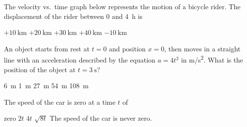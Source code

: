 \documentclass{../../../oss-apphys-exam}
\begin{document}
\begin{multicols*}{2}
\begin{questions}
    \question The velocity vs.\ time graph below represents the motion of a
    bicycle rider. The displacement of the rider between $0$ and \SI{4}{\hour}
    is
    \begin{center}
    \end{center}
    \begin{choices}
      \choice $+\SI{10}{\kilo\metre}$
      \choice $+\SI{20}{\kilo\metre}$
      \choice $+\SI{30}{\kilo\metre}$
      \choice $+\SI{40}{\kilo\metre}$
      \choice $-\SI{10}{\kilo\metre}$
    \end{choices}

    \question An object starts from rest at $t=0$ and position $x=0$, then moves
    in a straight line with an acceleration described by the equation $a=4t^2$
    in \si{m/s^2}. What is the position of the object at $t=\SI{3}{\second}$?
    \begin{choices}
      \choice\SI{6}{\metre}
      \choice\SI{1}{\metre}
      \choice\SI{27}{\metre}
      \choice\SI{54}{\metre}
      \choice\SI{108}{\metre}
    \end{choices}
    

    \question The speed of the car is zero at a time $t$ of
    \begin{choices}
      \choice zero
      \choice $2t$
      \choice $4t$
      \choice $\sqrt{8t}$
      \choice The speed of the car is never zero.
    \end{choices}
    \label{car1}
    

\end{questions}
\end{multicols*}
\end{document}

